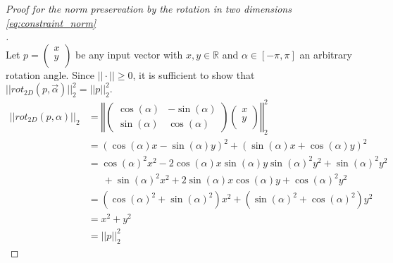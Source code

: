 \begin{proof}[Proof for the norm preservation by the rotation in two dimensions \eqref{eq:constraint_norm}\\]$\,$\\
	Let $p = \begin{pmatrix}x \\y \\\end{pmatrix}$ be any input vector with $x, y \in \mathbb{R}$ and $\alpha \in [-\pi, \pi]$ an arbitrary rotation angle. Since $||\cdot|| \geq 0$, it is sufficient to show that $||rot_{2D}(p, \vec{\alpha})||_2^2 = ||p||_2^2$.
	\begin{equation}
	\label{proof:norm_preservation}
	\begin{aligned}
	||rot_{2D}(p, \alpha)||_2 &= \left\Vert \begin{pmatrix} \cos(\alpha) & -\sin(\alpha) \\\sin(\alpha) & \cos(\alpha) \end{pmatrix} \begin{pmatrix}x \\y \\\end{pmatrix} \right\Vert_2^2 \\
	&= (\cos(\alpha)x - \sin(\alpha)y)^2 + (\sin(\alpha)x + \cos(\alpha)y)^2\\
	&= \cos(\alpha)^2x^2 -2\cos(\alpha)x\sin(\alpha)y \sin(\alpha)^2y^2 + \sin(\alpha)^2y^2\\ &\,\,\,\,\,\,\,\,\,+ \sin(\alpha)^2x^2 + 2\sin(\alpha)x\cos(\alpha)y + \cos(\alpha)^2y^2\\
	&= (\cos(\alpha)^2 + \sin(\alpha)^2)x^2 + (\sin(\alpha)^2 + \cos(\alpha)^2)y^2\\
	&= x^2 + y^2\\
	&= ||p||_2^2
	\end{aligned}
	\end{equation}
\end{proof}

